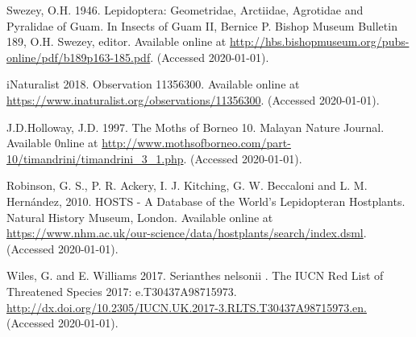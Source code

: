 \documentclass[english,letterpaper]{scrartcl}
\begin{document}
\clearpage

\begin{thebibliography}{1}	
	
	 Swezey, O.H. 1946. Lepidoptera: Geometridae, Arctiidae, Agrotidae and Pyralidae of Guam. In Insects of Guam II, Bernice P. Bishop Museum Bulletin 189, O.H. Swezey, editor. Available online at \url{http://hbs.bishopmuseum.org/pubs-online/pdf/b189p163-185.pdf}. (Accessed 2020-01-01).
	
	 iNaturalist 2018. Observation 11356300. Available online at  \url{https://www.inaturalist.org/observations/11356300}. (Accessed 2020-01-01).
	
	 J.D.Holloway, J.D. 1997. The Moths of Borneo 10. Malayan Nature Journal. Available 0nline at
	\url{http://www.mothsofborneo.com/part-10/timandrini/timandrini_3_1.php}. (Accessed 2020-01-01).
	
	 Robinson, G. S., P. R. Ackery, I. J. Kitching, G. W. Beccaloni and L. M. Hernández, 2010. HOSTS - A Database of the World's Lepidopteran Hostplants. Natural History Museum, London. Available online at \url{https://www.nhm.ac.uk/our-science/data/hostplants/search/index.dsml}. (Accessed 2020-01-01).
	
	 Wiles, G. and E. Williams 2017. Serianthes nelsonii . The IUCN Red List of Threatened Species 2017: e.T30437A98715973. \url{http://dx.doi.org/10.2305/IUCN.UK.2017-3.RLTS.T30437A98715973.en.} (Accessed 2020-01-01).
		
	
\end{thebibliography}
\end{document}
